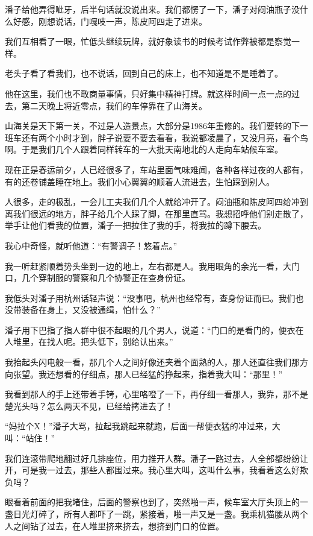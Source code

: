 潘子给他弄得呲牙，后半句话就没说出来。我们都愣了一下，潘子对闷油瓶子没什么好感，刚想说话，门嘎吱一声，陈皮阿四走了进来。

我们互相看了一眼，忙低头继续玩牌，就好象读书的时候考试作弊被都是察觉一样。

老头子看了看我们，也不说话，回到自己的床上，也不知道是不是睡着了。

他在这里，我们也不敢商量事情，只好集中精神打牌。就这样时间一点一点的过去，第二天晚上将近零点，我们的车停靠在了山海关。

山海关是天下第一关，不过是人造景点，大部分是1986年重修的。我们要转的下一班车还有两个小时才到，胖子说要不要去看看，我说都凌晨了，又没月亮，看个鸟啊。于是我们几个人跟着同样转车的一大批天南地北的人走向车站候车室。

现在正是春运前夕，人已经很多了，车站里面气味难闻，各种各样过夜的人都有，有的还卷铺盖睡在地上。我们小心翼翼的顺着人流进去，生怕踩到别人。

人很多，走的极乱，一会儿工夫我们几个人就给冲开了。闷油瓶和陈皮阿四给冲到离我们很远的地方，胖子给几个人踩了脚，在那里直骂。我想招呼他们别走散了，举手让他们看我的位置，潘子一把拉住了我的手，将我拉的蹲下腰去。

我心中奇怪，就听他道：“有警调子！悠着点。”

我一听赶紧顺着势头坐到一边的地上，左右都是人。我用眼角的余光一看，大门口，几个穿制服的警察和几个协警正在查身份证。

我低头对潘子用杭州话轻声说：“没事吧，杭州也经常有，查身份证而已。我们也没带装备在身上，又没被通缉，怕什么？”

潘子用下巴指了指人群中很不起眼的几个男人，说道：“门口的是看门的，便衣在人堆里，在找人呢。把头低下，别给认出来。”

我抬起头闪电般一看，那几个人之间好像还夹着个面熟的人，那人还直往我们那方向张望。我还想看的仔细点，那人已经猛的挣起来，指着我大叫：“那里！”

我看到那人的手上还带着手铐，心里咯噔了一下，再仔细一看那人，我靠，那不是楚光头吗？怎么两天不见，已经给拷进去了！

“妈拉个X！”潘子大骂，拉起我跳起来就跑，后面一帮便衣猛的冲过来，大叫：“站住！”

我们连滚带爬地翻过好几排座位，用力推开人群。潘子一路过去，人全部都纷纷让开，可是我一过去，那些人都围过来。我心里大叫，这叫什么事，我看着这么好欺负吗？

眼看着前面的把我堵住，后面的警察也到了，突然啪一声，候车室大厅头顶上的一盏日光灯碎了，所有人都吓了一跳，紧接着，啪一声又是一盏。我乘机猫腰从两个人之间钻了过去，在人堆里挤来挤去，想挤到门口的位置。

